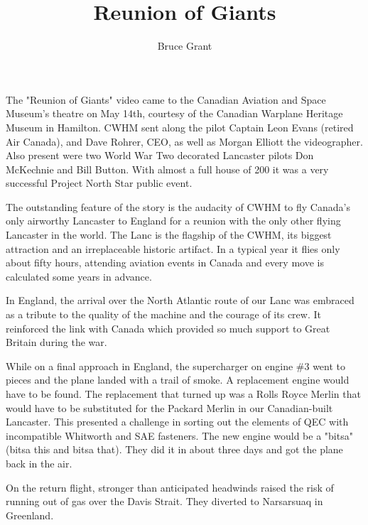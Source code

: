 %


\title{Reunion of Giants}
\author{Bruce Grant}

\maketitle


The "Reunion of Giants" video came to the Canadian Aviation and Space Museum's
theatre on May 14th, courtesy of the Canadian Warplane Heritage Museum in
Hamilton. CWHM sent along the pilot Captain Leon Evans (retired Air Canada), and
Dave Rohrer, CEO, as well as Morgan Elliott the videographer. Also present were
two World War Two decorated Lancaster pilots Don McKechnie and Bill Button. With
almost a full house of 200 it was a very successful Project North Star public
event.


The outstanding feature of the story is the audacity of CWHM to fly Canada's
only airworthy Lancaster to England for a reunion with the only other flying
Lancaster in the world. The Lanc is the flagship of the CWHM, its biggest
attraction and an irreplaceable historic artifact. In a typical year it flies
only about fifty hours, attending aviation events in Canada and every move is
calculated some years in advance.


In England, the arrival over the North Atlantic route of our Lanc was embraced
as a tribute to the quality of the machine and the courage of its crew. It
reinforced the link with Canada which provided so much support to Great Britain
during the war.


While on a final approach in England, the supercharger on engine \#3 went to
pieces and the plane landed with a trail of smoke. A replacement engine would
have to be found. The replacement that turned up was a Rolls Royce Merlin that
would have to be substituted for the Packard Merlin in our Canadian-built
Lancaster. This presented a challenge in sorting out the elements of QEC with
incompatible Whitworth and SAE fasteners. The new engine would be a "bitsa"
(bitsa this and bitsa that). They did it in about three days and got the plane
back in the air.


On the return flight, stronger than anticipated headwinds raised the risk of
running out of gas over the Davis Strait. They diverted to Narsarsuaq in
Greenland.


